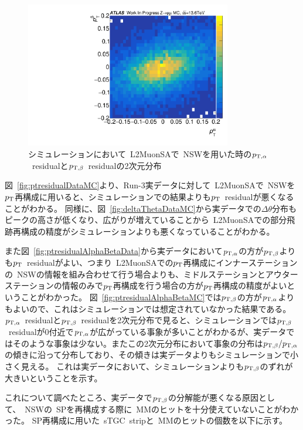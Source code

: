 \begin{figure}
    \centering
    \includegraphics[clip, width=9cm]{fig/5/ptresidual_alpha_beta_MC.pdf}
    \caption{シミュレーションにおいて~L2MuonSAで~NSWを用いた時の$p_{\mathrm{T}, \alpha}$~residualと$p_{\mathrm{T}, \beta}$~residualの2次元分布}
    \label{fig:2DptresidualAlphaBetaMC}
\end{figure}


図~\ref{fig:ptresidualDataMC}より、Run-3実データに対して~L2MuonSAで~NSWを$p_\mathrm{T}$再構成に用いると、シミュレーションでの結果よりも$p_\mathrm{T}$~residualが悪くなることがわかる。
同様に、図~\ref{fig:deltaThetaDataMC}から実データでの$\Delta \theta$分布もピークの高さが低くなり、広がりが増えていることから~L2MuonSAでの部分飛跡再構成の精度がシミュレーションよりも悪くなっていることがわかる。

また図~\ref{fig:ptresidualAlphaBetaData}から実データにおいて$p_{\mathrm{T}, \alpha}$の方が$p_{\mathrm{T}, \beta}$よりも$p_\mathrm{T}$~residualがよい、つまり~L2MuonSAでの$p_\mathrm{T}$再構成にインナーステーションの~NSWの情報を組み合わせて行う場合よりも、ミドルステーションとアウターステーションの情報のみで$p_\mathrm{T}$再構成を行う場合の方が$p_\mathrm{T}$再構成の精度がよいということがわかった。
図~\ref{fig:ptresidualAlphaBetaMC}では$p_{\mathrm{T}, \beta}$の方が$p_{\mathrm{T}, \alpha}$よりもよいので、これはシミュレーションでは想定されていなかった結果である。
$p_{\mathrm{T}, \alpha}$~residualと$p_{\mathrm{T}, \beta}$~residualを2次元分布で見ると、シミュレーションでは$p_{\mathrm{T}, \beta}$~residualが0付近で$p_{\mathrm{T}, \alpha}$が広がっている事象が多いことがわかるが、実データではそのような事象は少ない。またこの2次元分布において事象の分布は$p_{\mathrm{T}, \beta}/p_{\mathrm{T}, \alpha}$の傾きに沿って分布しており、その傾きは実データよりもシミュレーションで小さく見える。
これは実データにおいて、シミュレーションよりも$p_{\mathrm{T}, \beta}$のずれが大きいということを示す。

これについて調べたところ、実データで$p_{\mathrm{T}, \beta}$の分解能が悪くなる原因として、~NSWの~SPを再構成する際に~MMのヒットを十分使えていないことがわかった。
SP再構成に用いた~sTGC~stripと~MMのヒットの個数を以下に示す。

